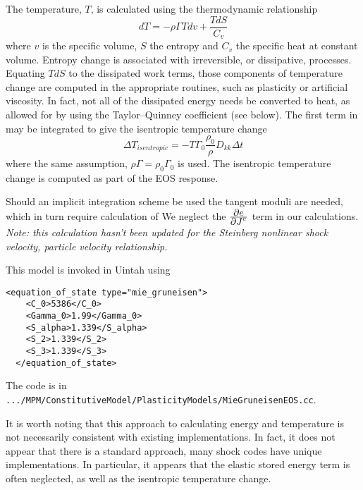 The temperature, $T$, is calculated using the thermodynamic relationship
  \begin{equation}\label{eq:dTthermo}
    dT = -\rho\Gamma T dv + \frac{TdS}{C_v}
  \end{equation}
where $v$ is the specific volume, $S$ the entropy and $C_v$ the specific heat at constant volume.
Entropy change is associated with irreversible, or dissipative, processes.  Equating $TdS$ to the
dissipated work terms, those components of temperature change are computed in the appropriate routines,
such as plasticity or artificial viscosity.  In fact, not all of the dissipated energy needs be
converted to heat, as allowed for by using the Taylor--Quinney coefficient (see below).  The first term
in \label{eq:dT} may be integrated to give the isentropic temperature change
  \begin{equation}\label{eq:dTisentropic}
    \Delta T_{isentropic} = -T\Gamma_0\frac{\rho_0}{\rho}D_{kk}\Delta t
  \end{equation}
where the same assumption, $\rho\Gamma=\rho_0\Gamma_0$ is used.  The isentropic temperature change
is computed as part of the EOS response.

Should an implicit integration scheme be used the tangent moduli are needed, which in turn require calculation of
\Beq
\Eeq
We neglect the $\Partial{e}{J^e}$ term in our calculations.  {\it Note: this calculation hasn't been updated for
the Steinberg nonlinear shock velocity, particle velocity relationship.}

This model is invoked in Uintah using
\begin{Verbatim}[fontsize=\footnotesize]
  <equation_of_state type="mie_gruneisen">
    <C_0>5386</C_0>
    <Gamma_0>1.99</Gamma_0>
    <S_alpha>1.339</S_alpha>
    <S_2>1.339</S_2>
    <S_3>1.339</S_3>
  </equation_of_state>
\end{Verbatim}
The code is in \verb|.../MPM/ConstitutiveModel/PlasticityModels/MieGruneisenEOS.cc|.

It is worth noting that this approach to calculating energy and temperature is not necessarily consistent
with existing implementations.  In fact, it does not appear that there is a standard approach, many shock
codes have unique implementations.  In particular, it appears that the elastic stored energy term is 
often neglected, as well as the isentropic temperature change.

